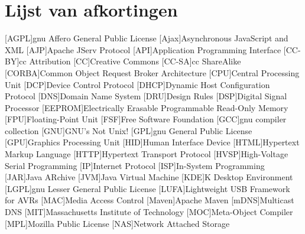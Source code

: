 %
%

\renewcommand{\lstlistlistingname}{Lijst van fragmenten}
\renewcommand{\lstlistingname}{Fragment}
\lstlistoflistings

\clearpage


%
%

\chapter*{Lijst van afkortingen}

\begin{acronym}[WYSIWYG]	%
[AGPL]{\acs{gnu} Affero General Public License}
[Ajax]{Asynchronous JavaScript and XML}
[AJP]{Apache JServ Protocol}
[API]{Application Programming Interface}
[CC-BY]{\acl{cc} Attribution}
[CC]{Creative Commons}
[CC-SA]{\acl{cc} ShareAlike}
[CORBA]{Common Object Request Broker Architecture}
[CPU]{Central Processing Unit}
[DCP]{Device Control Protocol}
[DHCP]{Dynamic Host Configuration Protocol}
[DNS]{Domain Name System}
[DRU]{Design Rules}
[DSP]{Digital Signal Processor}
[EEPROM]{Electrically Erasable Programmable Read-Only Memory}
[FPU]{Floating-Point Unit}
[FSF]{Free Software Foundation}
[GCC]{\acs{gnu} compiler collection}
[GNU]{GNU's Not Unix!}
[GPL]{\acs{gnu} General Public License}
[GPU]{Graphics Processing Unit}
[HID]{Human Interface Device}
[HTML]{Hypertext Markup Language}
[HTTP]{Hypertext Transport Protocol}
[HVSP]{High-Voltage Serial Programming}
[IP]{Internet Protocol}
[ISP]{In-System Programming}
[JAR]{Java ARchive}
[JVM]{Java Virtual Machine}
[KDE]{K Desktop Environment}
[LGPL]{\acs{gnu} Lesser General Public License}
[LUFA]{Lightweight USB Framework for AVRs}
[MAC]{Media Access Control}
[Maven]{Apache Maven}
[mDNS]{Multicast DNS}
[MIT]{Massachusetts Institute of Technology}
[MOC]{Meta-Object Compiler}
[MPL]{Mozilla Public License}
[NAS]{Network Attached Storage}

\end{acronym}
